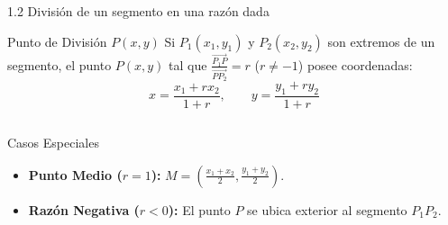 \documentclass[10pt,aspectratio=169,spanish]{beamer}
\begin{document}
\begin{frame}{1.2 División de un segmento en una razón dada}
\begin{block}{Punto de División $P(x,y)$}
Si $P_1(x_1,y_1)$ y $P_2(x_2,y_2)$ son extremos de un segmento, el punto $P(x,y)$ tal que $\frac{\vec{P_1P}}{\vec{PP_2}} = r$ ($r \neq -1$) posee coordenadas:
\[
  x = \dfrac{x_1 + r x_2}{1 + r}, \qquad y = \dfrac{y_1 + r y_2}{1 + r}
\]
\end{block}

\begin{columns}
  \begin{alertblock}{Casos Especiales}
  \begin{itemize}
    \item \textbf{Punto Medio ($r=1$):} $M = \left(\frac{x_1+x_2}{2}, \frac{y_1+y_2}{2}\right)$.
    \item \textbf{Razón Negativa ($r < 0$):} El punto $P$ se ubica exterior al segmento $P_1P_2$.
  \end{itemize}
  \end{alertblock}
  \begin{center}
  \end{center}
\end{columns}
\end{frame}
\end{document}
